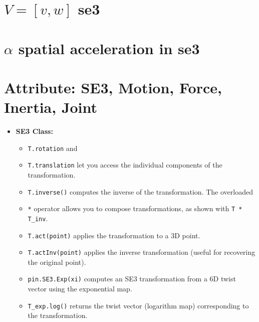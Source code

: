 \documentclass[10pt]{article}
\begin{document}
\section*{$V = [v,w]$ se3}
\section*{$\alpha$  spatial  acceleration in se3}


\section*{Attribute: SE3, Motion, Force, Inertia, Joint}


\begin{itemize}
    \item \textbf{SE3 Class:}
\begin{itemize}
    \item \texttt{T.rotation} and 
    \item \texttt{T.translation} let you access the individual components of the transformation.
    
    \item \texttt{T.inverse()} computes the inverse of the transformation. The overloaded 
    \item \texttt{*} operator allows you to compose transformations, as shown with \texttt{T * T\_inv}.
    
    \item \texttt{T.act(point)} applies the transformation to a 3D point. 
    \item \texttt{T.actInv(point)} applies the inverse transformation (useful for recovering the original point).
    
    \item \texttt{pin.SE3.Exp(xi)} computes an SE3 transformation from a 6D twist vector using the exponential map. 
    \item \texttt{T\_exp.log()} returns the twist vector (logarithm map) corresponding to the transformation.
\end{itemize}


\end{itemize}
\end{document}
